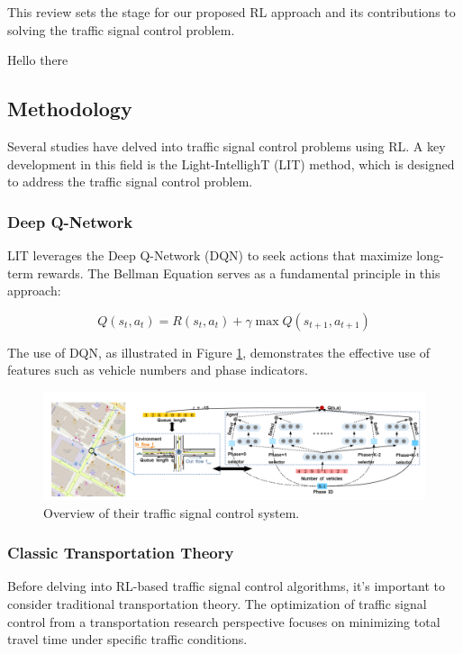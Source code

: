 This review sets the stage for our proposed RL approach and its contributions to solving the traffic signal control problem.


Hello there
\subsection{Methodology}

Several studies have delved into traffic signal control problems using RL. A key development in this field is the Light-IntellighT (LIT) method, which is designed to address the traffic signal control problem.

\subsubsection{Deep Q-Network}

LIT leverages the Deep Q-Network (DQN) to seek actions that maximize long-term rewards. The Bellman Equation \cite{sutton1999between} serves as a fundamental principle in this approach:

\[
Q(s_t, a_t) = R(s_t, a_t) + \gamma \max Q(s_{t+1}, a_{t+1})
\]

The use of DQN, as illustrated in Figure \ref{fig:diagnosis_figure}, demonstrates the effective use of features such as vehicle numbers and phase indicators.

\begin{figure}[h]
    \centering
    \includegraphics[width=1\linewidth]{images/related_work/overview.png}
    \caption{Overview of their traffic signal control system.\cite{zheng2019diagnosing}}
    \label{fig:diagnosis_figure}
\end{figure}

\subsubsection{Classic Transportation Theory}

Before delving into RL-based traffic signal control algorithms, it's important to consider traditional transportation theory. The optimization of traffic signal control from a transportation research perspective focuses on minimizing total travel time under specific traffic conditions.

